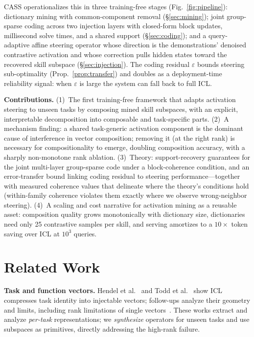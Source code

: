 \documentclass[sigconf,review,anonymous]{acmart}
\newcommand{\method}{\textsc{CASS}}
\begin{document}
\method{} operationalizes this in three training-free stages
(Fig.~\ref{fig:pipeline}): dictionary mining with common-component removal
(\S\ref{sec:mining}); joint group-sparse coding across two injection layers
with closed-form block updates, millisecond solve times, and a shared support
(\S\ref{sec:coding}); and a query-adaptive affine steering operator whose
direction is the demonstrations' denoised contrastive activation and whose
correction pulls hidden states toward the recovered skill subspace
(\S\ref{sec:injection}). The coding residual $\varepsilon$ bounds steering
sub-optimality (Prop.~\ref{prop:transfer}) and doubles as a deployment-time
reliability signal: when $\varepsilon$ is large the system can fall back to
full ICL.

\textbf{Contributions.}
(1)~The first training-free framework that adapts activation steering to
unseen tasks by composing mined skill subspaces, with an explicit,
interpretable decomposition into composable and task-specific parts.
(2)~A mechanism finding: a shared task-generic activation component is the
dominant cause of interference in vector composition; removing it (at the
right rank) is necessary for compositionality to emerge, doubling composition
accuracy, with a sharply non-monotone rank ablation.
(3)~Theory: support-recovery guarantees for the joint multi-layer
group-sparse code under a block-coherence condition, and an error-transfer
bound linking coding residual to steering performance---together with
measured coherence values that delineate where the theory's conditions hold
(within-family coherence violates them exactly where we observe
wrong-neighbor steering).
(4)~A scaling and cost narrative for activation mining as a reusable asset:
composition quality grows monotonically with dictionary size, dictionaries
need only 25 contrastive samples per skill, and serving amortizes to a
$10\times$ token saving over ICL at $10^3$ queries.

\section{Related Work}
\textbf{Task and function vectors.} Hendel et al.~\cite{hendel2023task} and
Todd et al.~\cite{todd2024function} show ICL compresses task identity into
injectable vectors; follow-ups analyze their geometry and limits, including
rank limitations of single vectors~\cite{ranklimit2026}. These works extract
and analyze \emph{per-task} representations; we \emph{synthesize} operators
for unseen tasks and use subspaces as primitives, directly addressing the
high-rank failure.
\end{document}
